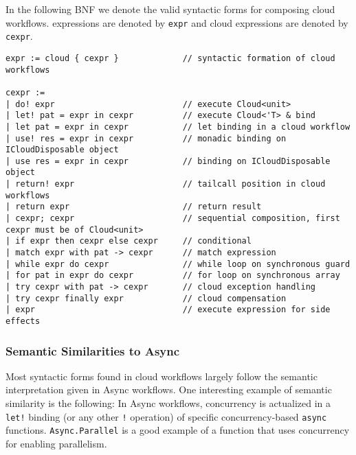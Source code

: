 In the following BNF we denote the valid syntactic forms for composing cloud workflows. 
\fsharp{} expressions are denoted by \texttt{expr} and cloud expressions are denoted by 
\texttt{cexpr}.
\begin{lstlisting}
expr := cloud { cexpr }             // syntactic formation of cloud workflows
 
cexpr :=
| do! expr							// execute Cloud<unit>
| let! pat = expr in cexpr          // execute Cloud<'T> & bind 
| let pat = expr in cexpr           // let binding in a cloud workflow
| use! res = expr in cexpr          // monadic binding on ICloudDisposable object
| use res = expr in cexpr           // binding on ICloudDisposable object
| return! expr                      // tailcall position in cloud workflows
| return expr                       // return result 
| cexpr; cexpr                      // sequential composition, first cexpr must be of Cloud<unit> 
| if expr then cexpr else cexpr     // conditional 
| match expr with pat -> cexpr      // match expression
| while expr do cexpr               // while loop on synchronous guard
| for pat in expr do cexpr          // for loop on synchronous array
| try cexpr with pat -> cexpr       // cloud exception handling
| try cexpr finally expr            // cloud compensation
| expr                              // execute expression for side effects
\end{lstlisting}

\subsubsection*{Semantic Similarities to Async}

Most syntactic forms found in cloud workflows largely follow the semantic interpretation
given in \fsharp{} Async workflows\cite{fsharp-async}. One interesting example of semantic
similarity is the following: In Async workflows, concurrency is actualized in a 
\texttt{let!} binding (or any other \texttt{!} operation) of specific concurrency-based 
\texttt{async} functions. \texttt{Async.Parallel} is a good example of a function that uses 
concurrency for enabling parallelism.

